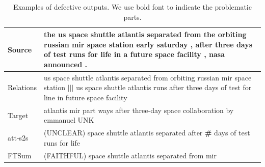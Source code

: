 \documentclass[letterpaper]{article} %
\begin{document}
\begin{table}[ht]
\begin{tabularx}{\linewidth}{p{1.2cm}|X}
			\multicolumn{1}{l|}{Source}    & the us space shuttle atlantis separated from the orbiting russian mir space station early saturday , after three days of test runs for life in a future space facility , nasa announced . \\ \hline
			\multicolumn{1}{l|}{Relations} & us space shuttle atlantis separated from orbiting russian mir space station $|||$ us space shuttle atlantis runs after three days of test for line in future space facility               \\ \hline
			\multicolumn{1}{l|}{Target}    & atlantis mir part ways after three-day space collaboration by emmanuel UNK                                                                                                                \\ \hline
			\multicolumn{1}{l|}{att-s2s}   & (UNCLEAR) space shuttle atlantis separated after \textbf{\#} days of test runs for life                                                                                     \\ \hline
			\multicolumn{1}{l|}{FTSum}     & (FAITHFUL) space shuttle atlantis separated from mir                                                                                                                          \\ \hline
		\end{tabularx}
		\caption{Examples of defective outputs. We use bold font to indicate the problematic parts.}
		\label{tb:faithfulness_examples}
	\end{table}
	
	
\end{document}
